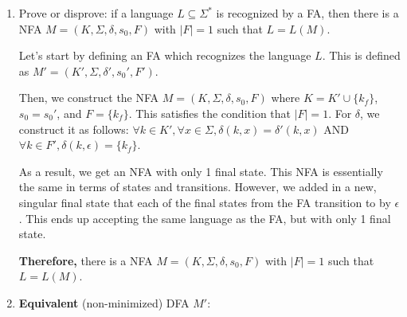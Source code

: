 \documentclass[12pt]{article}
\begin{document}
\begin{enumerate}



\item Prove or disprove: if a language $L \subseteq \Sigma^*$ is recognized by a FA, then there is a NFA $M = (K, \Sigma, \delta, s_0, F)$ with $|F| = 1$ such that $L = L(M)$.

\color{blue} Let's start by defining an FA which recognizes the language $L$. This is defined as $M' = (K', \Sigma, \delta', s_0', F')$.

Then, we construct the NFA $M = (K, \Sigma, \delta, s_0, F)$ where $K = K' \cup \{k_f\}$, $s_0 = s_0'$, and $F = \{k_f\}$. This satisfies the condition that $|F| = 1$. For $\delta$, we construct it as follows: $\forall k \in K', \forall x \in \Sigma, \delta(k, x) = \delta'(k, x)$ AND $\forall k \in F', \delta(k, \epsilon) = \{k_f\}$.

As a result, we get an NFA with only 1 final state. This NFA is essentially the same in terms of states and transitions. However, we added in a new, singular final state that each of the final states from the FA transition to by $\epsilon$. This ends up accepting the same language as the FA, but with only 1 final state.

\textbf{Therefore,} there is a NFA $M = (K, \Sigma, \delta, s_0, F)$ with $|F| = 1$ such that $L = L(M)$. \color{black}



\item \textbf{Equivalent} (non-minimized) DFA $M'$:

\end{enumerate}
\end{document}
